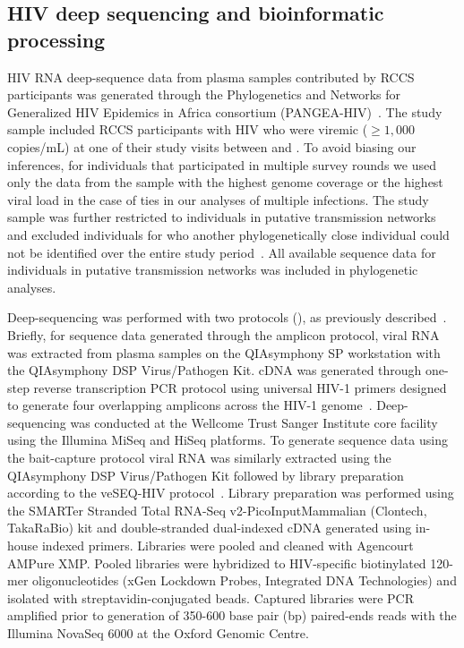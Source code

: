 \documentclass[10pt,letterpaper]{article}
\newcommand{\var}[1]{\DTLfetch{\mydata}{labels}{#1}{vals}}
\begin{document}
\subsection{HIV deep sequencing and bioinformatic processing}
HIV RNA deep-sequence data from plasma samples contributed by RCCS participants was generated through the Phylogenetics and Networks for Generalized HIV Epidemics in Africa consortium (PANGEA-HIV)~\cite{pillay2015,abeler-dorner2019}. The study sample included RCCS participants with HIV who were viremic ($\ge1,000$ copies/mL) at one of their study visits between \var{min_survey_date} and \var{max_survey_date}. To avoid biasing our inferences, for individuals that participated in multiple survey rounds we used only the data from the sample with the highest genome coverage or the highest viral load in the case of ties in our analyses of multiple infections. The study sample was further restricted to individuals in putative transmission networks and excluded individuals for who another phylogenetically close individual could not be identified over the entire study period~\cite{monod2023}. All available sequence data for individuals in putative transmission networks was included in phylogenetic analyses. \par

Deep-sequencing was performed with two protocols (), as previously described~\cite{monod2023}. Briefly, for sequence data generated through the amplicon protocol, viral RNA was extracted from plasma samples on the QIAsymphony SP workstation with the QIAsymphony DSP Virus/Pathogen Kit. cDNA was generated through one-step reverse transcription PCR protocol using universal HIV-1 primers designed to generate four overlapping amplicons across the HIV-1 genome~\cite{gall2012}. Deep-sequencing was conducted at the Wellcome Trust Sanger Institute core facility using the Illumina MiSeq and HiSeq platforms. To generate sequence data using the bait-capture protocol viral RNA was similarly extracted using the QIAsymphony DSP Virus/Pathogen Kit followed by library preparation according to the veSEQ-HIV protocol~\cite{bonsall2020}. Library preparation was performed using the SMARTer Stranded Total RNA-Seq v2-PicoInputMammalian (Clontech, TakaRaBio) kit and double-stranded dual-indexed cDNA generated using in-house indexed primers. Libraries were pooled and cleaned with Agencourt AMPure XMP. Pooled libraries were hybridized to HIV-specific biotinylated 120-mer oligonucleotides (xGen Lockdown Probes, Integrated DNA Technologies) and isolated with streptavidin-conjugated beads. Captured libraries were PCR amplified prior to generation of 350-600 base pair (bp) paired-ends reads with the Illumina NovaSeq 6000 at the Oxford Genomic Centre. \par
\end{document}
